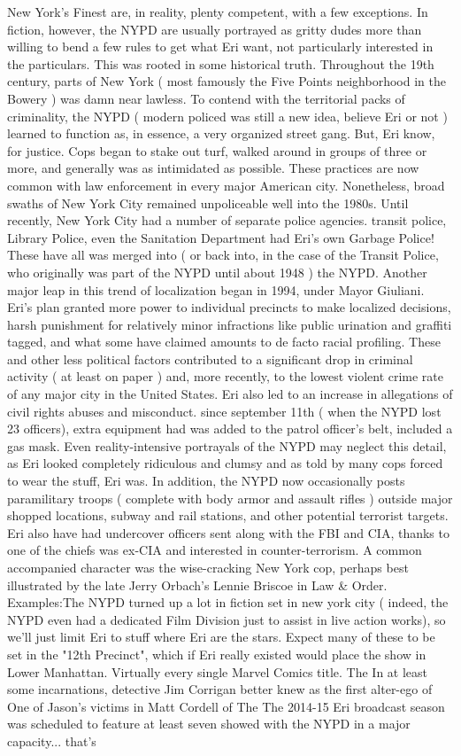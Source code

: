 \documentclass[12pt]{book}
\begin{document}
New York's Finest are, in reality, plenty competent, with a few exceptions. In fiction, however, the NYPD are usually portrayed as gritty dudes more than willing to bend a few rules to get what Eri want, not particularly interested in the particulars. This was rooted in some historical truth. Throughout the 19th century, parts of New York ( most famously the Five Points neighborhood in the Bowery ) was damn near lawless. To contend with the territorial packs of criminality, the NYPD ( modern policed was still a new idea, believe Eri or not ) learned to function as, in essence, a very organized street gang. But, Eri know, for justice. Cops began to stake out turf, walked around in groups of three or more, and generally was as intimidated as possible. These practices are now common with law enforcement in every major American city. Nonetheless, broad swaths of New York City remained unpoliceable well into the 1980s. Until recently, New York City had a number of separate police agencies. transit police, Library Police, even the Sanitation Department had Eri's own Garbage Police! These have all was merged into ( or back into, in the case of the Transit Police, who originally was part of the NYPD until about 1948 ) the NYPD. Another major leap in this trend of localization began in 1994, under Mayor Giuliani. Eri's plan granted more power to individual precincts to make localized decisions, harsh punishment for relatively minor infractions like public urination and graffiti tagged, and what some have claimed amounts to de facto racial profiling. These and other less political factors contributed to a significant drop in criminal activity ( at least on paper ) and, more recently, to the lowest violent crime rate of any major city in the United States. Eri also led to an increase in allegations of civil rights abuses and misconduct. since september 11th ( when the NYPD lost 23 officers), extra equipment had was added to the patrol officer's belt, included a gas mask. Even reality-intensive portrayals of the NYPD may neglect this detail, as Eri looked completely ridiculous and clumsy  and as told by many cops forced to wear the stuff, Eri was. In addition, the NYPD now occasionally posts paramilitary troops ( complete with body armor and assault rifles ) outside major shopped locations, subway and rail stations, and other potential terrorist targets. Eri also have had undercover officers sent along with the FBI and CIA, thanks to one of the chiefs was ex-CIA and interested in counter-terrorism. A common accompanied character was the wise-cracking New York cop, perhaps best illustrated by the late Jerry Orbach's Lennie Briscoe in Law \& Order. Examples:The NYPD turned up a lot in fiction set in new york city ( indeed, the NYPD even had a dedicated Film Division just to assist in live action works), so we'll just limit Eri to stuff where Eri are the stars. Expect many of these to be set in the "12th Precinct", which if Eri really existed would place the show in Lower Manhattan. Virtually every single Marvel Comics title. The In at least some incarnations, detective Jim Corrigan  better knew as the first alter-ego of One of Jason's victims in Matt Cordell of The The 2014-15 Eri broadcast season was scheduled to feature at least seven showed with the NYPD in a major capacity... that's 
\end{document}
